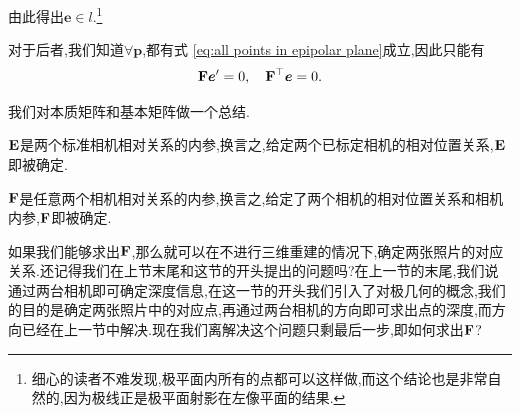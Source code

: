 由此得出$\bm e \in l$.\footnote{细心的读者不难发现,极平面内所有的点都可以这样做,而这个结论也是非常自然的,因为极线正是极平面射影在左像平面的结果.}

对于后者,我们知道$\forall \bm p$,都有式 \ref{eq:all points in epipolar plane}成立,因此只能有
\begin{equation}
	\bold{F} \boldsymbol e^\prime = 0, \quad \bold{F}^\top \boldsymbol e = 0.
\end{equation}

我们对本质矩阵和基本矩阵做一个总结.

$\bold{E}$是两个标准相机相对关系的内参,换言之,给定两个已标定相机的相对位置关系,$\bold{E}$即被确定.

$\bold{F}$是任意两个相机相对关系的内参,换言之,给定了两个相机的相对位置关系和相机内参,$\bold{F}$即被确定.

如果我们能够求出$\bold{F}$,那么就可以在不进行三维重建的情况下,确定两张照片的对应关系.还记得我们在上节末尾和这节的开头提出的问题吗?在上一节的末尾,我们说通过两台相机即可确定深度信息,在这一节的开头我们引入了对极几何的概念,我们的目的是确定两张照片中的对应点,再通过两台相机的方向即可求出点的深度,而方向已经在上一节中解决.现在我们离解决这个问题只剩最后一步,即如何求出$\bold{F}$?

